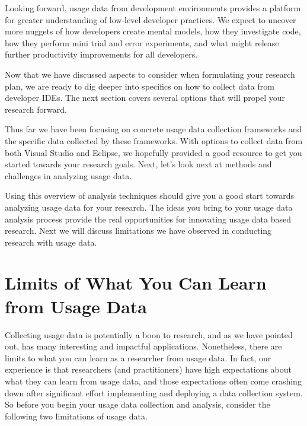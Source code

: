 \documentclass{book}
\begin{document}
Looking forward, usage data from development environments provides a platform for greater understanding of low-level developer practices.  We expect to uncover more nuggets of how developers create mental models, how they investigate code, how they perform mini trial and error experiments, and what might release further productivity improvements for all developers.


\pagebreak






Now that we have discussed aspects to consider when formulating your research plan, we are ready to dig deeper into specifics on how to collect data from developer IDEs.  The next section covers several options that will propel your research forward.






Thus far we have been focusing on concrete usage data collection frameworks and the specific data collected by these frameworks.  With options to collect data from both Visual Studio and Eclipse, we hopefully provided a good resource to get you started towards your research goals.  Next, let's look next at methods and challenges in analyzing usage data.

\newpage




Using this overview of analysis techniques should give you a good start towards analyzing usage data for your research.
The ideas you bring to your usage data analysis process provide the real opportunities for innovating usage data based research.  Next we will discuss limitations we have observed in conducting research with usage data.

\section{Limits of What You Can Learn from Usage Data}
\label{sec:limitations}

Collecting usage data is potentially a boon to research, and as we have
pointed out, has many interesting and impactful applications.
Nonetheless, there are limits to what you can learn as a researcher
from usage data.
In fact, our experience is that researchers (and practitioners) have
high expectations about what they can learn from usage data, and those
expectations often come crashing down after significant effort implementing
and deploying a data collection system.
So before you begin your usage data collection and analysis, consider
the following two limitations of usage data.
\end{document}
